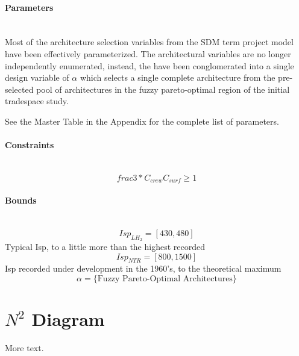 \documentclass[11pt]{article} %
\newcommand{\myparagraph}[1]{\paragraph{#1}\mbox{}\\}
\begin{document}
\myparagraph{Parameters}

Most of the architecture selection variables from the SDM term project model have been effectively parameterized.  The architectural variables are no longer independently enumerated, instead, the have been conglomerated into a single design variable of $\alpha$ which selects a single complete architecture from the pre-selected pool of architectures in the fuzzy pareto-optimal region of the initial tradespace study.

See the Master Table in the Appendix for the complete list of parameters.

\myparagraph{Constraints}

\begin{equation}
frac{3 * C_{crew}}{C_{surf}} \ge 1
\end{equation}

\myparagraph{Bounds}

\begin{equation*}
Isp_{LH_2}=[430,480]
\end{equation*}
Typical Isp, to a little more than the highest recorded
\begin{equation*}
Isp_{NTR}=[800,1500]
\end{equation*}
Isp recorded under development in the 1960's, to the theoretical maximum
\begin{equation*}
\alpha = \{\mbox{Fuzzy Pareto-Optimal Architectures}\}
\end{equation*}

\clearpage
\section{$N^2$ Diagram}

More text.
\end{document}
